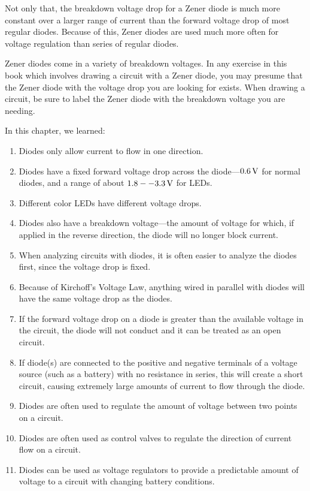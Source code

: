 Not only that, the breakdown voltage drop for a Zener diode is much more constant over a larger range of current than the forward voltage drop of most regular diodes.
Because of this, Zener diodes are used much more often for voltage regulation than series of regular diodes.

Zener diodes come in a variety of breakdown voltages.  
In any exercise in this book which involves drawing a circuit with a Zener diode, you may presume that the Zener diode with the voltage drop you are looking for exists.
When drawing a circuit, be sure to label the Zener diode with the breakdown voltage you are needing.

\reviewsection

In this chapter, we learned:

\begin{enumerate}
\item Diodes only allow current to flow in one direction.
\item Diodes have a fixed forward voltage drop across the diode---$0.6\,\si{\volt}$ for normal diodes, and a range of about $1.8--3.3\,\si{\volt}$ for LEDs.
\item Different color LEDs have different voltage drops.
\item Diodes also have a breakdown voltage---the amount of voltage for which, if applied in the reverse direction, the diode will no longer block current.
\item When analyzing circuits with diodes, it is often easier to analyze the diodes first, since the voltage drop is fixed.  
\item Because of Kirchoff's Voltage Law, anything wired in parallel with diodes will have the same voltage drop as the diodes.
\item If the forward voltage drop on a diode is greater than the available voltage in the circuit, the diode will not conduct and it can be treated as an open circuit.
\item If diode(s) are connected to the positive and negative terminals of a voltage source (such as a battery) with no resistance in series, this will create a short circuit, causing extremely large amounts of current to flow through the diode.
\item Diodes are often used to regulate the amount of voltage between two points on a circuit.
\item Diodes are often used as control valves to regulate the direction of current flow on a circuit.
\item Diodes can be used as voltage regulators to provide a predictable amount of voltage to a circuit with changing battery conditions.

\end{enumerate}
